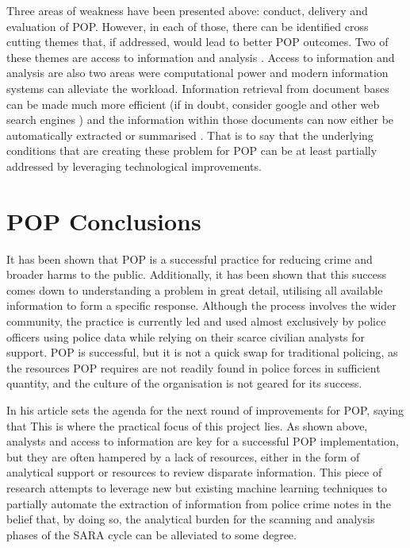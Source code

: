 Three areas of weakness have been presented above: conduct, delivery and evaluation of POP. However, in each of those, there can be identified cross cutting themes that, if addressed, would lead to better POP outcomes. Two of these themes are access to information and analysis  \parencite{POPUCL}. Access to information and analysis are also two areas were computational power and modern information systems can alleviate the workload. Information retrieval from document bases can be made much more efficient (if in doubt, consider google and other web search engines \parencite{manning2008introduction}) and the information within those documents can now either be automatically extracted or summarised \parencite{kumar2011natural}. That is to say that the underlying conditions that are creating these problem for POP can be at least partially addressed by leveraging technological improvements.

\section{POP Conclusions}


It has been shown that POP is a successful practice for reducing crime and broader harms to the public. Additionally, it has been shown that this success comes down to understanding a problem in great detail, utilising all available information to form a specific response. Although the process involves the wider community, the practice is currently led and used almost exclusively by police officers using police data while relying on their scarce civilian analysts for support. POP is successful, but it is not a quick swap for traditional policing, as the resources POP requires are not readily found in police forces in sufficient quantity, and the culture of the organisation is not geared for its success.

In his article \textcite{whitherpop} sets the agenda for the next round of improvements for POP, saying that    This is where the practical focus of this project lies. As shown above, analysts and access to information are key for a successful POP implementation, but they are often hampered by a lack of resources, either in the form of analytical support or resources to review disparate information. This piece of research attempts to leverage new but existing machine learning techniques to partially automate the extraction of information from police crime notes in the belief that, by doing so, the analytical burden for the scanning and analysis phases of the SARA cycle can be alleviated to some degree.



